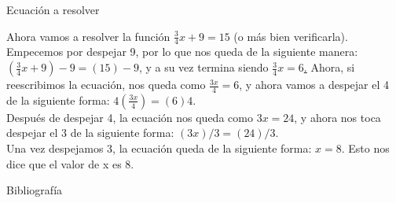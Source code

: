 \documentclass{beamer}
\begin{document}
\begin{frame}{Ecuación a resolver}

Ahora vamos a resolver la función \underline{$\frac{3}{4}x+9=15$} (o más bien verificarla).\\
Empecemos por despejar 9, por lo que nos queda de la siguiente manera: \underline{$(\frac{3}{4}x+9)-9=(15)-9$}, y a su vez termina siendo \underline{$\frac{3}{4}x=6$.}
Ahora, si reescribimos la ecuación, nos queda como \underline{$\frac{3x}{4}=6$}, y ahora vamos a despejar el 4 de la siguiente forma: \underline{$4(\frac{3x}{4})=(6)4$}.\\
Después de despejar 4, la ecuación nos queda como \underline{$3x=24$}, y ahora nos toca despejar el 3 de la siguiente forma: \underline{$(3x)/3=(24)/3$}.\\
Una vez despejamos 3, la ecuación queda de la siguiente forma: \underline{$x=8$}. Esto nos dice que el valor de x es 8.
    
\end{frame}

\begin{frame}{Bibliografía}
    
    
\end{frame}
\end{document}
